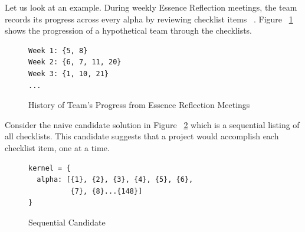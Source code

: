 \documentclass[3p,times,procedia]{elsarticle}
\begin{document}



Let us look at an example. During weekly Essence Reflection meetings, the team records its progress across every alpha by reviewing checklist items ~\cite{ICSE2014}. Figure ~\ref{history} shows the progression of a hypothetical team through the checklists.

\begin{figure}[!htb]
\begin{verbatim}
Week 1: {5, 8}
Week 2: {6, 7, 11, 20} 
Week 3: {1, 10, 21} 
...
\end{verbatim}
 \caption{History of Team's Progress from Essence Reflection Meetings}
 \label{history}
\end{figure}

Consider the naive candidate solution in Figure ~\ref{sequential_candidate} which is a sequential listing of all checklists. This candidate suggests that a project would accomplish each checklist item, one at a time.

\begin{figure}[!htb]
\begin{verbatim}
kernel = {
  alpha: [{1}, {2}, {3}, {4}, {5}, {6}, 
          {7}, {8}...{148}]
}
\end{verbatim}
 \caption{Sequential Candidate}
 \label{sequential_candidate}
\end{figure}
\end{document}
